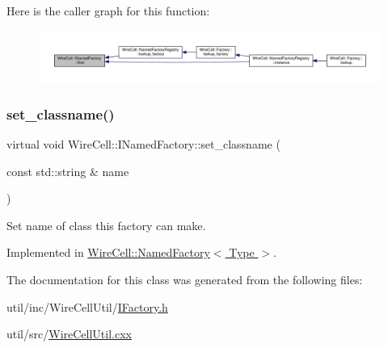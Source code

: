 Here is the caller graph for this function\+:
\nopagebreak
\begin{figure}[H]
\begin{center}
\leavevmode
\includegraphics[width=350pt]{class_wire_cell_1_1_i_named_factory_a4e87a7c8957a57aa6d23fef2f9e1dbd3_icgraph}
\end{center}
\end{figure}
\mbox{\label{class_wire_cell_1_1_i_named_factory_a9175190c6f03f9d7fb43f3c8643e10d6}} 
\subsubsection{\texorpdfstring{set\+\_\+classname()}{set\_classname()}}
{\footnotesize\ttfamily virtual void Wire\+Cell\+::\+I\+Named\+Factory\+::set\+\_\+classname (\begin{DoxyParamCaption}\item[{const std\+::string \&}]{name }\end{DoxyParamCaption})\hspace{0.3cm}{\ttfamily [pure virtual]}}



Set name of class this factory can make. 



Implemented in \hyperlink{class_wire_cell_1_1_named_factory_afd42539ccd3d6f8b49b0afa5b675747b}{Wire\+Cell\+::\+Named\+Factory$<$ Type $>$}.



The documentation for this class was generated from the following files\+:\begin{DoxyCompactItemize}
\item 
util/inc/\+Wire\+Cell\+Util/\hyperlink{_i_factory_8h}{I\+Factory.\+h}\item 
util/src/\hyperlink{_wire_cell_util_8cxx}{Wire\+Cell\+Util.\+cxx}\end{DoxyCompactItemize}
